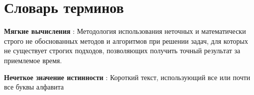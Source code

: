 \chapter*{Словарь терминов}             %

\textbf{Мягкие вычисления} : Методология использования неточных и математически строго не обоснованных методов и алгоритмов при решении задач, для которых не существует строгих подходов, позволяющих получить точный результат за приемлемое время.

\textbf{Нечеткое значение истинности} : Короткий текст, использующий все или почти все буквы алфавита
